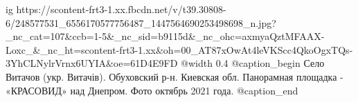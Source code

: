  
 
 
 
 

\ifcmt
  ig https://scontent-frt3-1.xx.fbcdn.net/v/t39.30808-6/248577531_6556170577756487_1447564690253498698_n.jpg?_nc_cat=107&ccb=1-5&_nc_sid=b9115d&_nc_ohc=axmyaQztMFAAX-Loxc_&_nc_ht=scontent-frt3-1.xx&oh=00_AT87xOwAt4leVKScc4QkoOgxTQs-3YhCLNylrVrnx6UYIA&oe=61D4E9FD
  @width 0.4
  @caption_begin
    Село Витачов (укр. Витачів). Обуховский р-н. Киевская обл. 
    Панорамная площадка - «КРАСОВИД» над Днепром. Фото октябрь 2021 года.
  @caption_end
\fi

